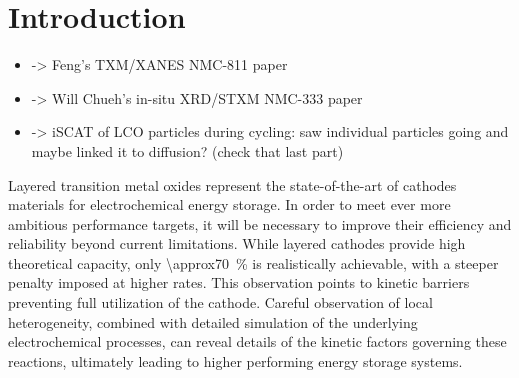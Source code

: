 \documentclass{article}
\begin{document}
\maketitle

\listoftodos

\section{Introduction}

\begin{itemize}
\item {} -> Feng's TXM/XANES NMC-811 paper
\item {} -> Will Chueh's in-situ XRD/STXM NMC-333 paper
\item {} -> iSCAT of LCO particles during cycling: saw
  individual particles going and maybe linked it to diffusion? (check
  that last part)
\end{itemize}

Layered transition metal oxides represent the state-of-the-art of
cathodes materials for electrochemical energy storage. In order to
meet ever more ambitious performance targets, it will be necessary to
improve their efficiency and reliability beyond current
limitations. While layered cathodes provide high theoretical capacity,
only \SI{\approx70}{\percent} is realistically achievable, with a
steeper penalty imposed at higher rates\citeme{}. This observation
points to kinetic barriers preventing full utilization of the
cathode. Careful observation of local heterogeneity, combined with
detailed simulation of the underlying electrochemical processes, can
reveal details of the kinetic factors governing these reactions,
ultimately leading to higher performing energy storage systems.

\end{document}
